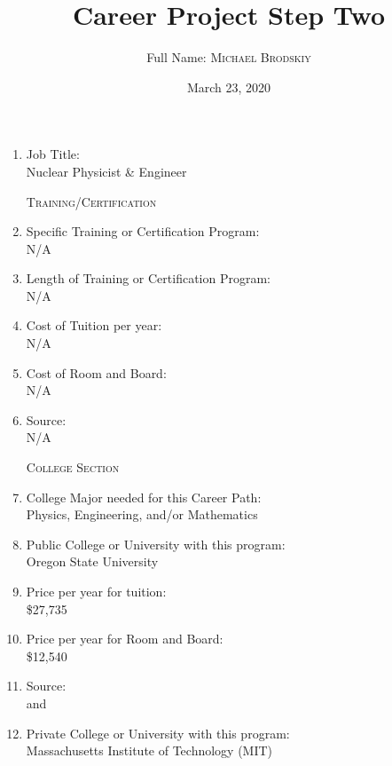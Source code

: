 \documentclass{article}
\title{Career Project Step Two}
\author{Full Name: \textsc{Michael Brodskiy}}
\date{March 23, 2020}
\begin{document}
\maketitle

\begin{enumerate}

\item Job Title:\\
Nuclear Physicist \& Engineer

\begin{center}
\textsc{Training/Certification}
\end{center}

\item Specific Training or Certification Program:\\
N/A

\item Length of Training or Certification Program:\\
N/A

\item Cost of Tuition per year:\\
N/A

\item Cost of Room and Board:\\
N/A

\item Source:\\
N/A

\begin{center}
\textsc{College Section}
\end{center}

\item College Major needed for this Career Path:\\
Physics, Engineering, and/or Mathematics

\item Public College or University with this program:\\
Oregon State University

\item Price per year for tuition:\\
\$27,735

\item Price per year for Room and Board:\\
\$12,540

\item Source:\\
\cite{Naviance:1} and \cite{oneStop}

\item Private College or University with this program:\\
Massachusetts Institute of Technology (\textsc{MIT})


\end{enumerate}
\end{document}
